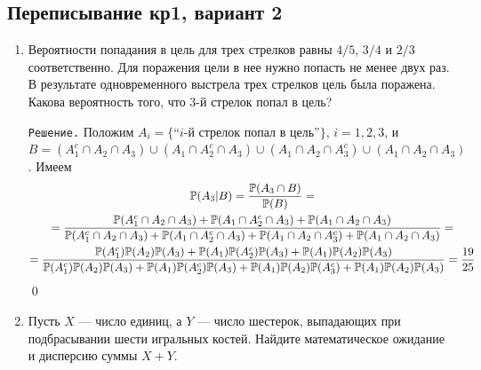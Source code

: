 \documentclass[12pt, a4paper]{article}\usepackage[]{graphicx}\usepackage[]{color}
\begin{document}
\subsection{Переписывание кр1, вариант 2}
\begin{enumerate}
\item %
Вероятности попадания в цель для трех стрелков равны $4/5$, $3/4$ и $2/3$ соответственно. Для поражения цели в нее нужно попасть не менее двух раз. В результате одновременного выстрела трех стрелков цель была поражена. Какова вероятность того, что 3-й стрелок попал в цель?

\verb"Решение." Положим $A_i = \{\text{``$i$-й стрелок попал в цель''}\}$, $i = 1,2,3$, и $B = (A_1^c \cap A_2 \cap A_3) \cup (A_1 \cap A_2^c \cap A_3) \cup (A_1 \cap A_2 \cap A_3^c) \cup (A_1 \cap A_2 \cap A_3)$. Имеем
\begin{multline}
\P(A_3|B) = \frac{\P(A_3 \cap B)}{\P(B)} = \\
= \frac{\P(A_1^c \cap A_2 \cap A_3) + \P(A_1 \cap A_2^c \cap A_3) + \P(A_1 \cap A_2 \cap A_3)}{\P(A_1^c \cap A_2 \cap A_3) + \P(A_1 \cap A_2^c \cap A_3) + \P(A_1 \cap A_2 \cap A_3^c) + \P(A_1 \cap A_2 \cap A_3)} = \\
= \frac{\P(A_1^c)\P(A_2)\P(A_3) + \P(A_1)\P(A_2^c)\P(A_3) + \P(A_1)\P(A_2)\P(A_3)}{\P(A_1^c)\P(A_2)\P(A_3) + \P(A_1)\P(A_2^c)\P(A_3) + \P(A_1)\P(A_2)\P(A_3^c) + \P(A_1)\P(A_2)\P(A_3)} = \frac{19}{25}
\end{multline}
\qed
\item %
Пусть $X$ — число единиц, а $Y$ — число шестерок, выпадающих при подбрасывании шести игральных костей. Найдите математическое ожидание и дисперсию суммы $X+Y$.


\end{enumerate}
\end{document}

